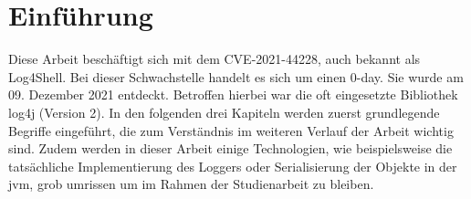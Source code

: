 
\section{Einführung}\label{sec:einfuhrung}
Diese Arbeit beschäftigt sich mit dem CVE-2021-44228, auch bekannt als Log4Shell. Bei dieser Schwachstelle handelt es sich
um einen 0-day. Sie wurde am 09. Dezember 2021 entdeckt. Betroffen hierbei war die oft eingesetzte Bibliothek log4j (Version 2). In den
folgenden drei Kapiteln werden zuerst grundlegende Begriffe eingeführt, die zum Verständnis im weiteren Verlauf der Arbeit wichtig sind.
Zudem werden in dieser Arbeit einige Technologien, wie beispielsweise die tatsächliche Implementierung des Loggers oder Serialisierung der Objekte in der
\gls{jvm}, grob umrissen um im Rahmen der Studienarbeit zu bleiben.



